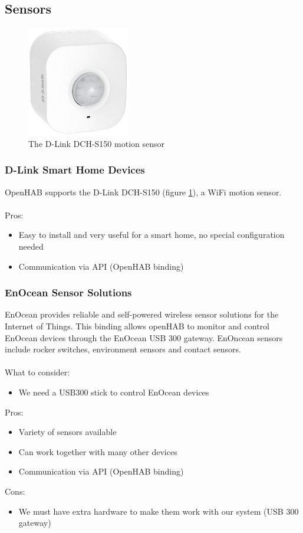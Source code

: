 \subsection{Sensors}

\begin{figure}
	\centering
	\includegraphics[width=0.4\textwidth]{images/Chapter_04/d-link-motion-sensor.jpg}
	\caption{The D-Link DCH-S150 motion sensor}
	\label{fig:d-link-motion-sensor}
\end{figure}

\subsubsection{D-Link Smart Home Devices}
OpenHAB supports the D-Link DCH-S150 (figure \ref{fig:d-link-motion-sensor}), a WiFi motion sensor.\\~\\
Pros:
\begin{itemize}
	\item Easy to install and very useful for a smart home, no special configuration needed
	\item Communication via API (OpenHAB binding)
\end{itemize}

\subsubsection{EnOcean Sensor Solutions}
EnOcean provides reliable and self-powered wireless sensor solutions for the Internet of Things. This binding allows openHAB
to monitor and control EnOcean devices through the EnOcean USB 300 gateway. EnOncean sensors include rocker switches,
environment sensors and contact sensors.\\~\\
What to consider:
\begin{itemize}
	\item We need a USB300 stick to control EnOcean devices
\end{itemize}
Pros:
\begin{itemize}
	\item Variety of sensors available
	\item Can work together with many other devices
	\item Communication via API (OpenHAB binding)
\end{itemize}
Cons:
\begin{itemize}
	\item We must have extra hardware to make them work with our system (USB 300 gateway)
\end{itemize}

